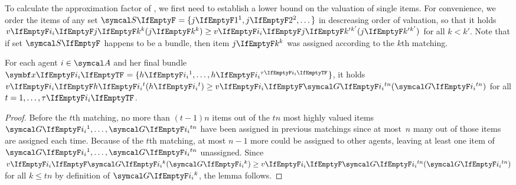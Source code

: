 To calculate the approximation factor of \SMatch, we first need to establish a lower bound on the valuation of single items.
For convenience, we order the items of any set \(\genericset = \{ \genericitem[1], \genericitem[2], \dots \}\) in descreasing order of valuation, so that it holds \(\valuations[\genericitem[k]] \ge \valuations[\genericitem[k']]\) for all \(k < k'\).
Note that if set \(\genericset\) happens to be a bundle, then item \(\genericitem[k]\) was assigned according to the \(k\)th matching.
\begin{lemma}
	\label{lem:lower_bound_single_item}
	For each agent \(i \in \agents\) and her final bundle \(\alloc = \{\asgd{1}, \dots, \asgd{\alloclen}\}\), it holds \(\valuations[\asgd{t}] \ge \valuations[\goodsordered{tn}]\) for all \(t = 1, \dots, \alloclen\).
\end{lemma}
\begin{proof}
	Before the \(t\)th matching, no more than \((t-1) n\) items out of the \(tn\) most highly valued items \(\goodsordered{1}, \dots, \goodsordered{tn}\) have been assigned in previous matchings since at most~\(n\) many out of those items are assigned each time.
	Because of the \(t\)th matching, at most \(n-1\) more could be assigned to other agents, leaving at least one item of \(\goodsordered{1}, \dots, \goodsordered{tn}\) unassigned.
	Since \(\valuations[\goodsordered{k}] \ge \valuations[\goodsordered{tn}]\) for all \(k \le tn\) by definition of \(\goodsordered{k}\), the lemma follows.
\end{proof}

